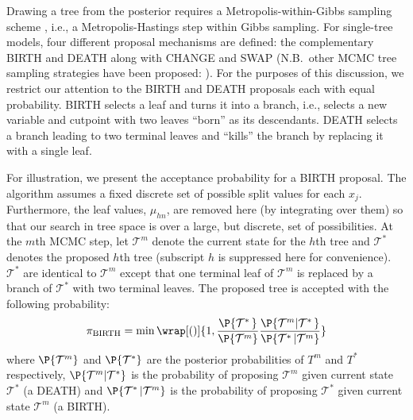 \documentclass[cmbright,doublespace]{WileySTAT-V1}
\theoremstyle{plain}
\begin{document}
Drawing a tree from the posterior requires a Metropolis-within-Gibbs
sampling scheme \citep{Muel91,Muel93}, i.e., a Metropolis-Hastings
step \citep{MetrRose53,Hast70} within Gibbs sampling.  For
single-tree models, four different proposal mechanisms are defined:
the complementary BIRTH and DEATH along with CHANGE and SWAP
\citep{ChipGeor98,ChipGeor13} (N.B.\ other MCMC tree sampling
strategies have been proposed: \citet{DeniMall98,WuTjel07,Prat16}).
For the purposes of this discussion, we restrict our attention to
the BIRTH and DEATH proposals each with equal probability.  BIRTH
selects a leaf and turns it into a branch, i.e., selects a new
variable and cutpoint with two leaves ``born'' as its
descendants. DEATH selects a branch leading to two terminal leaves and
``kills'' the branch by replacing it with a single
leaf. %

For illustration, we present the acceptance probability for a BIRTH
proposal.  The algorithm assumes a fixed discrete set of possible
split values for each $x_j$. %
Furthermore, the leaf values, $\mu_{hn}$, are removed here (by
integrating over them) so that our search in tree space is over a
large, but discrete, set of possibilities.  At the $m$th MCMC step,
let $\mathcal{T}^m$ denote the current state for the $h$th tree and
$\mathcal{T}^*$ denotes the proposed $h$th tree (subscript $h$ is
suppressed here for convenience).  $\mathcal{T}^*$ are identical to
$\mathcal{T}^m$ except that one terminal leaf of $\mathcal{T}^m$ is
replaced by a branch of $\mathcal{T}^*$ with two terminal leaves.  The
proposed tree is accepted with the following probability:
\begin{align*}
\pi_{\mathrm{BIRTH}}=\min\wrap[()]{1, \frac{\P{\mathcal{T}^*\,}}{\P{\mathcal{T}^m}}
\frac{\P{\mathcal{T}^m|\mathcal{T}^*\,}} {\P{\mathcal{T}^*\,|\mathcal{T}^m}}}
\end{align*} where $\P{\mathcal{T}^m}$ and $\P{\mathcal{T}^*}$
are the posterior probabilities of ${T}^m$ and ${T}^*$
respectively, $\P{\mathcal{T}^m|\mathcal{T}^*}$
is the probability of proposing $\mathcal{T}^m$ given current
state $\mathcal{T}^*$ (a DEATH) and
$\P{\mathcal{T}^*\,|\mathcal{T}^m}$
is the probability of proposing $\mathcal{T}^*$ given current
state $\mathcal{T}^m$ (a BIRTH).
\end{document}
